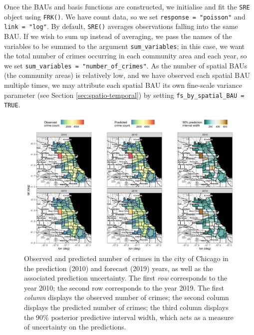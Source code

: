 \documentclass[12pt,a4paper]{article}
\begin{document}
Once the BAUs and basis functions are constructed, we initialise and fit the \texttt{SRE} object using \texttt{FRK()}. 
 We have count data, so we set \texttt{response = "poisson"} and \texttt{link = "log"}.
 By default, \texttt{SRE()} averages observations falling into the same BAU. 
 If we wish to sum up instead of averaging, we pass the names of the variables to be summed to the argument \texttt{sum\_variables}; in this case, we want the total number of crimes occurring in each community area and each year, so we set \texttt{sum\_variables = "number\_of\_crimes"}.
As the number of spatial BAUs (the community areas) is relatively low, and we have observed each spatial BAU multiple times, we may attribute each spatial BAU its own fine-scale variance parameter (see Section \ref{sec:spatio-temporal}) by setting \texttt{fs\_by\_spatial\_BAU = TRUE}.

\begin{figure}[t!]
    \centering
    \includegraphics[width = \linewidth]{Images/chicago_validation_predictions.pdf}
    \caption{Observed and predicted number of crimes in the city of Chicago in the prediction (2010) and forecast (2019) years, as well as the associated prediction uncertainty. The first \textit{row} corresponds to the year 2010; the second row corresponds to the year 2019. The first \textit{column} displays the observed number of crimes; the second column displays the predicted number of crimes; the third column displays the 90\% posterior predictive interval width, which acts as a measure of uncertainty on the predictions.
}   
  \label{fig:chicago_validation_predictions}
\end{figure}
\end{document}
